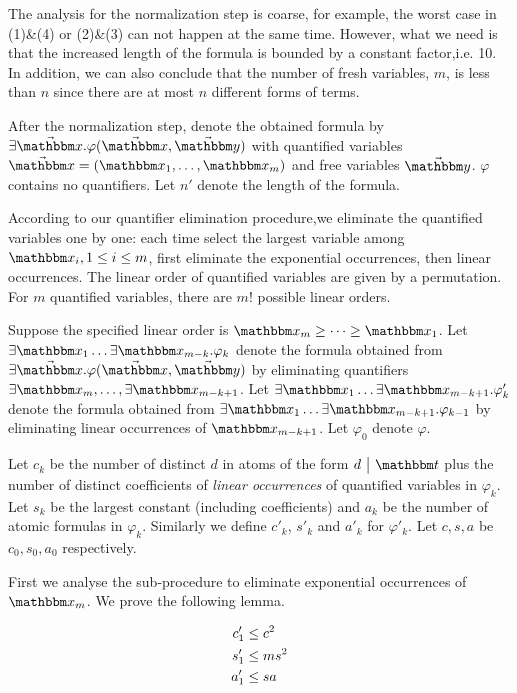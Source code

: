The analysis for the normalization step is coarse, for example, the worst case in (1)\&(4) or (2)\&(3) can not happen at the same time. However, what we need is that the increased length of the formula is bounded by a constant factor,i.e. 10. In addition, we can also conclude that the number of fresh variables, $m$, is less than $n$ since there are at most $n$ different forms of terms. 

After the normalization step, denote the obtained formula by $\exists \vec{\ivarx}. \varphi(\vec{\ivarx},\vec{\ivary})$ with quantified variables $\vec{\ivarx} = (\ivarx_1,\dots,\ivarx_m)$ and free variables $\vec{\ivary}$. $\varphi$ contains no quantifiers. 
Let $n'$ denote the length of the formula.

According to our quantifier elimination procedure,we eliminate the quantified variables one by one: each time select the largest variable among $\ivarx_i,1\le i\le m$, first eliminate the exponential occurrences, then linear occurrences. The linear order of quantified variables are given by a permutation. For $m$ quantified variables, there are $m!$ possible linear orders.

Suppose the specified linear order is $\ivarx_m\ge \dots \ge \ivarx_1$. Let $\exists \ivarx_1\dots \exists\ivarx_{m-k}.\varphi_k$ denote the formula obtained from $\exists \vec{\ivarx}. \varphi(\vec{\ivarx},\vec{\ivary})$ by eliminating quantifiers $\exists \ivarx_m,\dots,\exists\ivarx_{m-k+1}$. Let $\exists \ivarx_1 \dots \exists \ivarx_{m-k+1}.\varphi'_k$ denote the formula obtained from $\exists \ivarx_1\dots \exists\ivarx_{m-k+1}.\varphi_{k-1}$ by eliminating linear occurrences of $\ivarx_{m-k+1}$. Let $\varphi_0$ denote $\varphi$.

Let $c_k$ be the number of distinct $d$ in atoms of the form $d \ \big | \ \iterm$ plus the number of distinct coefficients of \emph{linear occurrences} of quantified variables in $\varphi_k$. Let $s_k$ be the largest constant (including coefficients) and $a_k$ be the number of atomic formulas in $\varphi_k$. Similarly we define $c'_k$, $s'_k$ and $a'_k$ for $\varphi'_k$. Let $c,s,a$ be $c_0,s_0,a_0$ respectively. 


First we analyse the sub-procedure to eliminate exponential occurrences of $\ivarx_m$. We prove the following lemma.

\begin{lemma}\label{lem:cpx exp}
    \begin{align}
        c'_1&\le c^2 \notag \\
        s'_1&\le ms^2 \notag\\
        a'_1&\le sa\notag 
    \end{align} 
\end{lemma}

